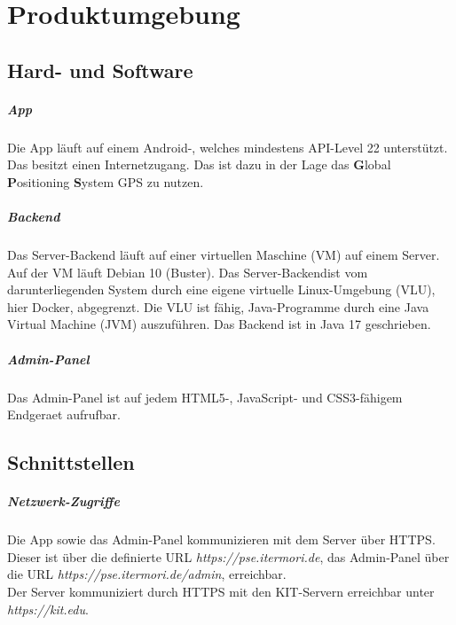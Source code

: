 \newpage
\chapter{Produktumgebung}

\section{Hard- und Software}
    \paragraph{App}
        Die App läuft auf einem \Gls{Android}-, welches mindestens \Gls{API-Level} 22 unterstützt.
        Das  besitzt einen Internetzugang.
        Das  ist dazu in der Lage das \textbf{G}lobal \textbf{P}ositioning \textbf{S}ystem \Gls{GPS} zu nutzen.

    \paragraph{Backend}
        Das \Gls{Server}-\Gls{Backend} läuft auf einer virtuellen Maschine (\Gls{VM}) auf einem \Gls{Server}.
        Auf der \Gls{VM} läuft \Gls{Debian} 10 (Buster).
        Das \Gls{Server}-\Gls{Backend}ist vom darunterliegenden System durch eine eigene virtuelle Linux-Umgebung (\Gls{VLU}), hier \Gls{Docker}, abgegrenzt.
        Die \Gls{VLU} ist fähig, \Gls{Java}-Programme durch eine Java Virtual Machine (\Gls{JVM}) auszuführen.
        Das \Gls{Backend} ist in \Gls{Java} 17 geschrieben.

    \paragraph{Admin-Panel}
        Das \Gls{Admin-Panel} ist auf jedem \Gls{HTML5}-, \Gls{JavaScript}- und \Gls{CSS3}-fähigem \Gls{Endgeraet} aufrufbar.

\section{Schnittstellen}
    \paragraph{Netzwerk-Zugriffe}
        Die App sowie das \Gls{Admin-Panel} kommunizieren mit dem \Gls{Server} über \Gls{HTTPS}. Dieser ist über die definierte \Gls{URL} \textit{https://pse.itermori.de},
        das \Gls{Admin-Panel} über die \Gls{URL} \textit{https://pse.itermori.de/admin}, erreichbar. \\
        Der \Gls{Server} kommuniziert durch \Gls{HTTPS} mit den \Gls{KIT}-Servern erreichbar unter \textit{https://kit.edu}.
